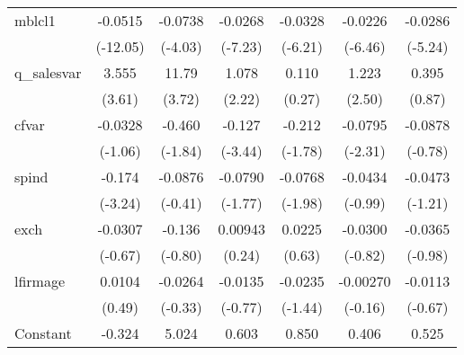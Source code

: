 \begin{table}[htbp]
\begin{tabular}{l*{6}{c}}
\addlinespace
mblcl1              &     -0.0515\sym{***}&     -0.0738\sym{***}&     -0.0268\sym{***}&     -0.0328\sym{***}&     -0.0226\sym{***}&     -0.0286\sym{***}\\
                    &    (-12.05)         &     (-4.03)         &     (-7.23)         &     (-6.21)         &     (-6.46)         &     (-5.24)         \\
\addlinespace
q\_salesvar          &       3.555\sym{***}&       11.79\sym{***}&       1.078\sym{*}  &       0.110         &       1.223\sym{*}  &       0.395         \\
                    &      (3.61)         &      (3.72)         &      (2.22)         &      (0.27)         &      (2.50)         &      (0.87)         \\
\addlinespace
cfvar               &     -0.0328         &      -0.460         &      -0.127\sym{***}&      -0.212         &     -0.0795\sym{*}  &     -0.0878         \\
                    &     (-1.06)         &     (-1.84)         &     (-3.44)         &     (-1.78)         &     (-2.31)         &     (-0.78)         \\
\addlinespace
spind               &      -0.174\sym{**} &     -0.0876         &     -0.0790         &     -0.0768\sym{*}  &     -0.0434         &     -0.0473         \\
                    &     (-3.24)         &     (-0.41)         &     (-1.77)         &     (-1.98)         &     (-0.99)         &     (-1.21)         \\
\addlinespace
exch                &     -0.0307         &      -0.136         &     0.00943         &      0.0225         &     -0.0300         &     -0.0365         \\
                    &     (-0.67)         &     (-0.80)         &      (0.24)         &      (0.63)         &     (-0.82)         &     (-0.98)         \\
\addlinespace
lfirmage            &      0.0104         &     -0.0264         &     -0.0135         &     -0.0235         &    -0.00270         &     -0.0113         \\
                    &      (0.49)         &     (-0.33)         &     (-0.77)         &     (-1.44)         &     (-0.16)         &     (-0.67)         \\
\addlinespace
Constant            &      -0.324         &       5.024\sym{***}&       0.603\sym{***}&       0.850\sym{***}&       0.406\sym{***}&       0.525\sym{***}\\

\end{tabular}
\end{table}

